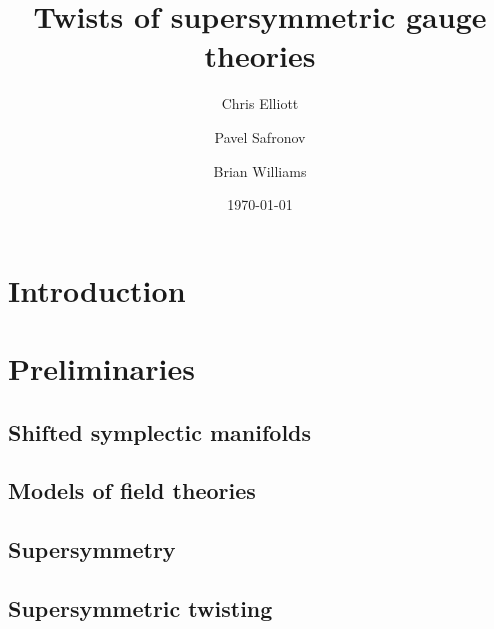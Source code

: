 \documentclass[10pt, oneside]{article}
\title{Twists of supersymmetric gauge theories}
\author{Chris Elliott\and Pavel Safronov \and Brian Williams}
\date{\today}
\begin{document}
\maketitle

\section{Introduction}

\section{Preliminaries}

\subsection{Shifted symplectic manifolds}


\subsection{Models of field theories}


\subsection{Supersymmetry} \label{sec: susy}



\subsection{Supersymmetric twisting}

\end{document}
